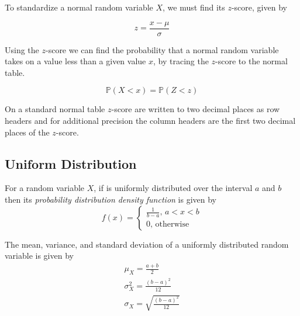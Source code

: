 \documentclass[12pt letter]{report}
\begin{document}


To standardize a normal random variable $X$, we must find its $z$-score, given by

\[
	z = \frac{x - \mu }{\sigma }
\]



Using the $z$-score we can find the probability that a normal random variable takes on a value less than a given value
$x$, by tracing the $z$-score to the normal table.

\[
	\mathbb{P} \left( X < x \right) = \mathbb{P} \left( Z < z \right)
\]

On a standard normal table $z$-score are written to two decimal places as row headers and for additional precision the
column headers are the first two decimal places of the $z$-score.




\subsection{Uniform Distribution}


For a random variable $X$, if is uniformly distributed over the interval $a$ and $b$ then its \textit{probability distribution
	density function} is given by
\[
	f \left( x \right)  = \begin{cases}
		\frac{1}{b - a}, \, a < x < b \\
		0, \, \text{otherwise}
	\end{cases}
\]

The mean, variance, and standard deviation of a uniformly distributed random variable is given by
\begin{align*}
	\mu_X = \frac{a + b}{2}                         \\
	\sigma^2_X = \frac{\left( b - a \right)^2 }{12} \\
	\sigma_X = \sqrt{\frac{\left( b - a \right)^2 }{12}}
\end{align*}
\end{document}
